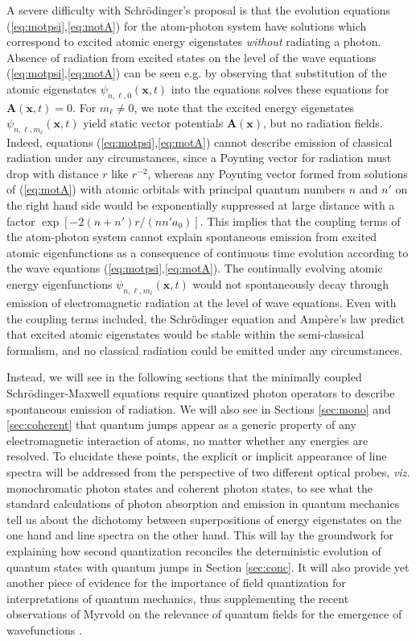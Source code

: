 \documentclass[final,3p,12pt]{elsarticle3}
\begin{document}
A severe difficulty with Schr\"odinger's proposal is that the evolution 
equations (\ref{eq:motpsi},\ref{eq:motA}) for the atom-photon system 
have solutions which correspond to excited atomic energy eigenstates 
{\it without} radiating a photon. Absence of radiation from excited states 
on the level of the wave equations (\ref{eq:motpsi},\ref{eq:motA}) can 
be seen e.g. by observing that substitution of the atomic 
eigenstates $\psi_{n,\ell,0}(\bm{x},t)$ into the equations solves these 
equations for $\bm{A}(\bm{x},t)=0$. For $m_\ell\neq 0$, 
we note that the excited energy eigenstates $\psi_{n,\ell,m_\ell}(\bm{x},t)$ 
yield static vector potentials $\bm{A}(\bm{x})$, but no radiation fields.
Indeed, equations (\ref{eq:motpsi},\ref{eq:motA})
cannot describe emission of classical radiation under any circumstances, since
a Poynting vector for radiation must drop with distance $r$ like $r^{-2}$, whereas
any Poynting vector formed from solutions of (\ref{eq:motA}) with atomic orbitals with
principal quantum numbers $n$ and $n'$ on the right hand side would be exponentially
suppressed at large distance with a factor $\exp[-2(n+n')r/(nn'a_0)]$. 
This implies that the coupling terms of the atom-photon 
system cannot explain spontaneous emission from excited atomic eigenfunctions as a 
consequence of continuous time evolution according to the wave 
equations (\ref{eq:motpsi},\ref{eq:motA}). 
The continually evolving atomic energy eigenfunctions $\psi_{n,\ell,m_\ell}(\bm{x},t)$
would not spontaneously decay through 
emission of electromagnetic radiation at the level of wave equations. 
Even with the coupling terms included, the Schr\"odinger equation and Amp\`{e}re's 
law predict that excited atomic eigenstates would be stable within the 
semi-classical formalism, and no classical radiation could be emitted under
any circumstances. 

Instead, we will see in the following sections that the minimally coupled
Schr\"odinger-Maxwell equations require quantized photon operators to describe
spontaneous emission of radiation. We will also 
see in Sections \ref{sec:mono} and \ref{sec:coherent} that quantum jumps appear as a 
generic property of any electromagnetic interaction of atoms, no matter whether any 
energies are resolved. To elucidate these points, the explicit
or implicit appearance of line spectra will be addressed from the perspective of two 
different optical probes, {\it viz.} monochromatic photon states and coherent photon states, 
to see what the standard calculations of 
photon absorption and emission in quantum mechanics tell us about the dichotomy between 
superpositions of energy eigenstates on the one hand and line spectra on the other hand. 
This will lay the groundwork for explaining how second quantization 
reconciles the deterministic evolution of quantum states with quantum jumps
in Section \ref{sec:conc}.
It will also provide yet another piece of evidence for the importance of field
quantization for interpretations of quantum mechanics, thus supplementing the recent
observations of Myrvold on the relevance of quantum fields for the emergence of 
wavefunctions \cite{myrvold}.
\end{document}
